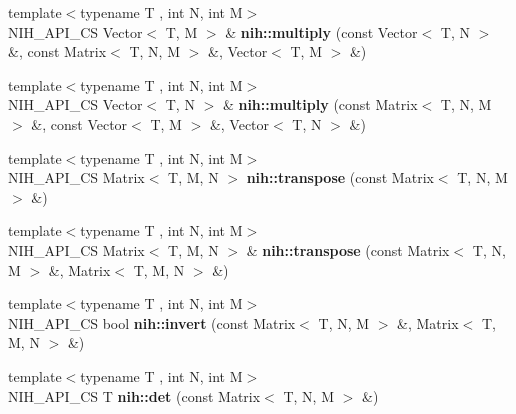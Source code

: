 \begin{DoxyCompactItemize}
\item 
\hypertarget{group__linalg_ga3b402229a02f14d9742452c586f5215d}{
{\footnotesize template$<$typename T , int \-N, int \-M$>$ }\\\-N\-I\-H\-\_\-\-A\-P\-I\-\_\-\-C\-S \-Vector$<$ \-T, \-M $>$ \& {\bfseries nih\-::multiply} (const \-Vector$<$ \-T, \-N $>$ \&, const \-Matrix$<$ \-T, \-N, \-M $>$ \&, \-Vector$<$ \-T, \-M $>$ \&)}
\label{group__linalg_ga3b402229a02f14d9742452c586f5215d}

\item 
\hypertarget{group__linalg_ga0f199ec8806602a51e72f64b9ee2860c}{
{\footnotesize template$<$typename T , int \-N, int \-M$>$ }\\\-N\-I\-H\-\_\-\-A\-P\-I\-\_\-\-C\-S \-Vector$<$ \-T, \-N $>$ \& {\bfseries nih\-::multiply} (const \-Matrix$<$ \-T, \-N, \-M $>$ \&, const \-Vector$<$ \-T, \-M $>$ \&, \-Vector$<$ \-T, \-N $>$ \&)}
\label{group__linalg_ga0f199ec8806602a51e72f64b9ee2860c}

\item 
\hypertarget{group__linalg_ga3585b1336ed34f070bbffd8904057a72}{
{\footnotesize template$<$typename T , int \-N, int \-M$>$ }\\\-N\-I\-H\-\_\-\-A\-P\-I\-\_\-\-C\-S \-Matrix$<$ \-T, \-M, \-N $>$ {\bfseries nih\-::transpose} (const \-Matrix$<$ \-T, \-N, \-M $>$ \&)}
\label{group__linalg_ga3585b1336ed34f070bbffd8904057a72}

\item 
\hypertarget{group__linalg_ga317a79a13fca76856e3c4500ec8eeffa}{
{\footnotesize template$<$typename T , int \-N, int \-M$>$ }\\\-N\-I\-H\-\_\-\-A\-P\-I\-\_\-\-C\-S \-Matrix$<$ \-T, \-M, \-N $>$ \& {\bfseries nih\-::transpose} (const \-Matrix$<$ \-T, \-N, \-M $>$ \&, \-Matrix$<$ \-T, \-M, \-N $>$ \&)}
\label{group__linalg_ga317a79a13fca76856e3c4500ec8eeffa}

\item 
\hypertarget{group__linalg_ga0f2181373ff7ef8ed392ccf8f92b8b97}{
{\footnotesize template$<$typename T , int \-N, int \-M$>$ }\\\-N\-I\-H\-\_\-\-A\-P\-I\-\_\-\-C\-S bool {\bfseries nih\-::invert} (const \-Matrix$<$ \-T, \-N, \-M $>$ \&, \-Matrix$<$ \-T, \-M, \-N $>$ \&)}
\label{group__linalg_ga0f2181373ff7ef8ed392ccf8f92b8b97}

\item 
\hypertarget{group__linalg_ga23f8ea3658a91f52bf853a4865f7df80}{
{\footnotesize template$<$typename T , int \-N, int \-M$>$ }\\\-N\-I\-H\-\_\-\-A\-P\-I\-\_\-\-C\-S \-T {\bfseries nih\-::det} (const \-Matrix$<$ \-T, \-N, \-M $>$ \&)}
\label{group__linalg_ga23f8ea3658a91f52bf853a4865f7df80}


\end{DoxyCompactItemize}
